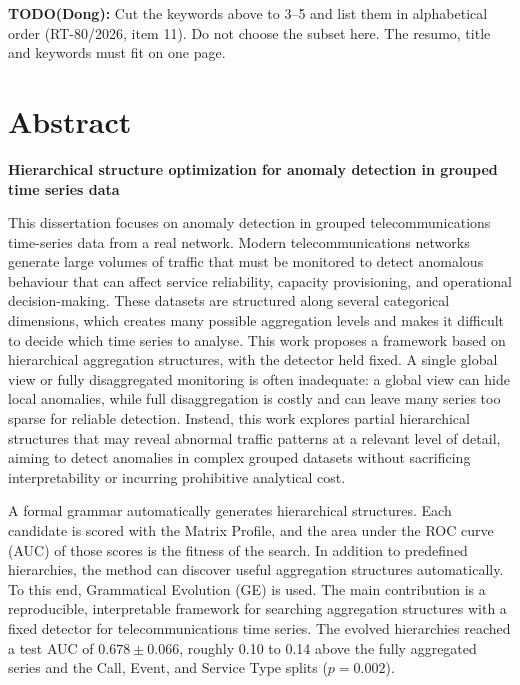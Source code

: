 \noindent\textbf{TODO(Dong):} Cut the keywords above to 3--5 and list them in alphabetical order (RT-80/2026, item 11). Do not choose the subset here. The resumo, title and keywords must fit on one page.

\clearpage
{}
\section*{Abstract}

\begin{center}
\textbf{Hierarchical structure optimization for anomaly detection in grouped time series data}
\end{center}

This dissertation focuses on anomaly detection in grouped telecommunications time-series data from a real network.
Modern telecommunications networks generate large volumes of traffic that must be monitored to detect anomalous behaviour that can affect service reliability, capacity provisioning, and operational decision-making.
These datasets are structured along several categorical dimensions, which creates many possible aggregation levels and makes it difficult to decide which time series to analyse.
This work proposes a framework based on hierarchical aggregation structures, with the detector held fixed.
A single global view or fully disaggregated monitoring is often inadequate: a global view can hide local anomalies, while full disaggregation is costly and can leave many series too sparse for reliable detection.
Instead, this work explores partial hierarchical structures that may reveal abnormal traffic patterns at a relevant level of detail, aiming to detect anomalies in complex grouped datasets without sacrificing interpretability or incurring prohibitive analytical cost.

A formal grammar automatically generates hierarchical structures.
Each candidate is scored with the Matrix Profile, and the area under the ROC curve (AUC) of those scores is the fitness of the search.
In addition to predefined hierarchies, the method can discover useful aggregation structures automatically.
To this end, Grammatical Evolution (\ac{GE}) \parencite{oneill2001grammatical,oneill2003} is used.
The main contribution is a reproducible, interpretable framework for searching aggregation structures with a fixed detector for telecommunications time series.
The evolved hierarchies reached a test AUC of $0.678 \pm 0.066$, roughly 0.10 to 0.14 above the fully aggregated series and the Call, Event, and Service Type splits ($p = 0.002$).

